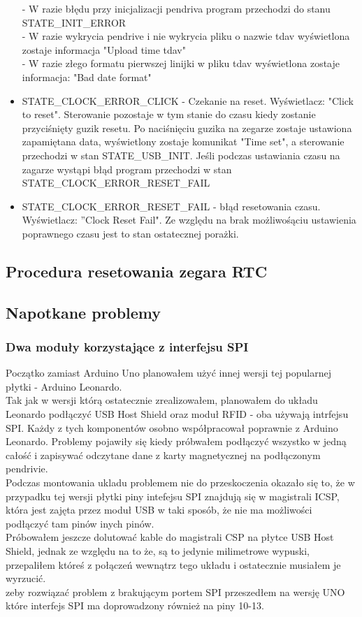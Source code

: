 \documentclass[declaration,shortabstract, mgr]{iithesis}
\begin{document}
\begin{itemize}
- W razie błędu przy inicjalizacji pendriva program przechodzi do stanu STATE\_INIT\_ERROR \\
- W razie wykrycia pendrive i nie wykrycia pliku o nazwie tdav wyświetlona zostaje informacja "Upload time tdav"\\
- W razie złego formatu pierwszej linijki w pliku tdav wyświetlona zostaje informacja: "Bad date format"
\item STATE\_CLOCK\_ERROR\_CLICK - Czekanie na reset. Wyświetlacz: "Click to reset".  Sterowanie pozostaje w tym stanie do czasu kiedy zostanie przyciśnięty guzik resetu. Po naciśnięciu guzika na zegarze zostaje ustawiona zapamiętana data, wyświetlony zostaje komunikat "Time set", a sterowanie przechodzi w stan STATE\_USB\_INIT. Jeśli podczas ustawiania czasu na zagarze wystąpi błąd program przechodzi w stan STATE\_CLOCK\_ERROR\_RESET\_FAIL \\
\item STATE\_CLOCK\_ERROR\_RESET\_FAIL - błąd resetowania czasu. Wyświetlacz: ''Clock Reset Fail". Ze względu na brak możliwośąciu ustawienia poprawnego czasu jest to stan ostatecznej porażki.
\end{itemize}
\subsection{Procedura resetowania zegara RTC}

\subsection{Napotkane problemy}
\subsubsection{Dwa moduły korzystające z interfejsu SPI}
\indent Początko zamiast Arduino Uno planowałem użyć innej wersji tej popularnej płytki - Arduino Leonardo. \\
\indent Tak jak w wersji którą ostatecznie zrealizowałem, planowałem do układu Leonardo podłączyć USB Host Shield oraz moduł RFID - oba używają intrfejsu SPI. Każdy z tych komponentów osobno współpracował poprawnie z Arduino Leonardo. Problemy pojawiły się kiedy próbwałem podłączyć wszystko w jedną całość i zapisywać odczytane dane z karty magnetycznej na podłączonym pendrivie. \\
\indent Podczas montowania ukladu problemem nie do przeskoczenia okazało się to, że w przypadku tej wersji płytki piny intefejsu SPI znajdują się w magistrali ICSP, która jest zajęta przez moduł USB w taki sposób, że nie ma możliwości podłączyć tam pinów inych pinów. \\
\indent Próbowałem jeszcze dolutować kable do magistrali CSP na płytce  USB Host Shield, jednak ze względu na to że, są to jedynie milimetrowe wypuski, przepaliłem któreś z połączeń wewnątrz tego układu i ostatecznie musiałem je wyrzucić. \\
\indent zeby rozwiązać problem z brakującym portem SPI przeszedłem na wersję UNO które interfejs SPI ma doprowadzony również na piny 10-13. \\
\end{document}
